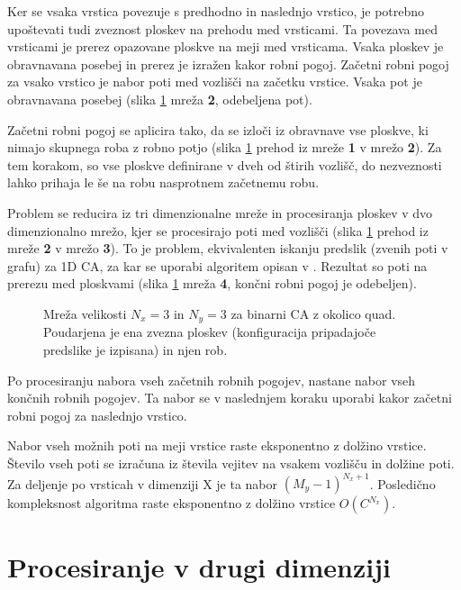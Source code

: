 \documentclass[12pt,a4paper,openany,twoside]{book}
\begin{document}
Ker se vsaka vrstica povezuje s predhodno in naslednjo vrstico, je potrebno
upoštevati tudi zveznost ploskev na prehodu med vrsticami.
Ta povezava med vrsticami je prerez opazovane ploskve na meji med vrsticama.
Vsaka ploskev je obravnavana posebej in prerez je izražen kakor robni pogoj.
Začetni robni pogoj za vsako vrstico je nabor poti med vozlišči na začetku vrstice.
Vsaka pot je obravnavana posebej (slika \ref{algorithm_line} mreža \textbf{2}, odebeljena pot).

Začetni robni pogoj se aplicira tako, da se izloči iz obravnave vse ploskve,
ki nimajo skupnega roba z robno potjo (slika \ref{algorithm_line}
prehod iz mreže \textbf{1} v mrežo \textbf{2}). Za tem korakom, so vse ploskve definirane
v dveh od štirih vozlišč, do nezveznosti lahko prihaja le še na robu nasprotnem
začetnemu robu.

Problem se reducira iz tri dimenzionalne mreže in procesiranja ploskev v
dvo dimenzionalno mrežo, kjer se procesirajo poti med vozlišči (slika \ref{algorithm_line}
prehod iz mreže \textbf{2} v mrežo \textbf{3}). To je problem, ekvivalenten iskanju predslik
(zvenih poti v grafu) za 1D CA, za kar se uporabi algoritem opisan v \cite{}.
Rezultat so poti na prerezu med ploskvami (slika \ref{algorithm_line} mreža \textbf{4},
končni robni pogoj je odebeljen).

\begin{figure}[htb]
\centerline{}
\caption[Mreža polja celic.]{Mreža velikosti \(N_x=3\) in \(N_y=3\) za binarni CA z okolico quad.
Poudarjena je ena zvezna ploskev (konfiguracija pripadajoče predslike je izpisana) in njen rob.}
\label{algorithm_line}
\end{figure}

Po procesiranju nabora vseh začetnih robnih pogojev, nastane nabor vseh končnih robnih pogojev.
Ta nabor se v naslednjem koraku uporabi kakor začetni robni pogoj za naslednjo vrstico.

Nabor vseh možnih poti na meji vrstice raste eksponentno z dolžino vrstice.
Število vseh poti se izračuna iz števila vejitev na vsakem vozlišču in dolžine poti.
Za deljenje po vrsticah v dimenziji X je ta nabor \( (M_y-1)^{N_x+1} \).
Posledično kompleksnost algoritma raste eksponentno z dolžino vrstice \(O(C^{N_x})\).

\section{Procesiranje v drugi dimenziji}
\end{document}
